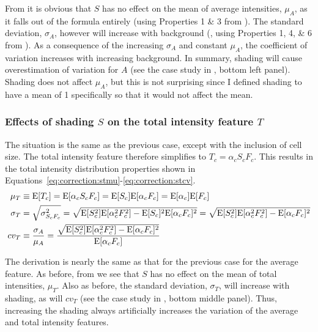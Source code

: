 From  it is obvious that $S$ has no effect on
the mean of average intensities, $\mu_A$, as it falls out of the formula entirely
(using Properties 1 \& 3 from ).
The standard deviation, $\sigma_A$, however will increase
with background (,
using Properties 1, 4, \& 6 from ).
As a consequence of the
increasing $\sigma_A$ and constant $\mu_A$, the coefficient of variation
increases with increasing background. In summary, shading will cause
overestimation of variation for $A$
(see the case study in , bottom left panel).
Shading does not affect $\mu_A$, but this
is not surprising since I defined shading to have a mean of 1 specifically
so that it would not affect the mean.
    
    

\subsubsection{Effects of shading $S$ on the total intensity feature $T$}


The situation is the same as the previous case, except with the inclusion of cell size.
The total intensity feature 
therefore simplifies to $T_c=\alpha_c S_c F_c$.
This results in the total intensity distribution properties shown in 
Equations~\ref{eq:correction:stmu}\nobreakdash-\ref{eq:correction:stcv}.
    \begin{align}
    \mu_T    & \equiv \mathrm{E}[T_c] = \mathrm{E}[\alpha_c S_c F_c] = \mathrm{E}[S_c]\mathrm{E}[\alpha_c F_c]=
        \mathrm{E}[\alpha_c]\mathrm{E}[F_c]
        \label{eq:correction:stmu}\\
    \sigma_T & = \sqrt{\sigma^2_{S_c F_c}} =  \sqrt{ \mathrm{E}[S_c^2]\mathrm{E}[\alpha_c^2 F_c^2]-
        \mathrm{E}[S_c]^2\mathrm{E}[\alpha_c F_c]^2 }
        = \sqrt{ \mathrm{E}[S_c^2]\mathrm{E}[\alpha_c^2 F_c^2]-\mathrm{E}[\alpha_c F_c]^2 }
        \label{eq:correction:stsd}\\
    cv_T     & \equiv \frac{\sigma_A}{\mu_A} = \frac{ \sqrt{\mathrm{E}[S_c^2]\mathrm{E}[\alpha_c^2 F_c^2]-
        \mathrm{E}[\alpha_c F_c]^2} }
        { \mathrm{E}[\alpha_c F_c] }
        \label{eq:correction:stcv}
    \end{align}


The derivation is nearly the same as that for the
previous case for the average feature.
As before, from  we see that $S$ has no effect on
the mean of total intensities, $\mu_T$. Also as before,
the standard deviation, $\sigma_T$, will increase
with shading, as will $cv_T$
(see the case study in , bottom middle panel).
Thus, increasing the shading always artificially
increases the variation of the average and total intensity features.



